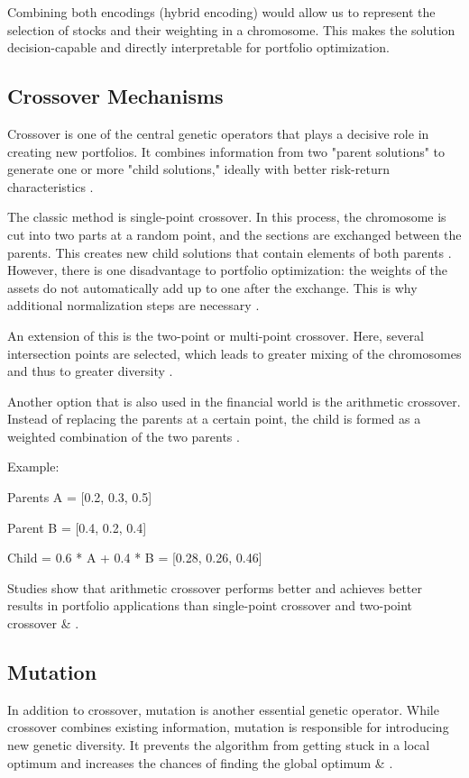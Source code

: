 \documentclass{agasthesis}
\begin{document}
Combining both encodings (hybrid encoding) would allow us to represent the selection of stocks and their weighting in a chromosome. 
This makes the solution decision-capable and directly interpretable for portfolio optimization.

\subsection{Crossover Mechanisms}
Crossover is one of the central genetic operators that plays a decisive role in creating new portfolios. It combines information from two "parent solutions" 
to generate one or more "child solutions," ideally with better risk-return characteristics \cite[p. 8-9]{melanie_introduction_1999}.

The classic method is single-point crossover. In this process, the chromosome is cut into two parts at a random point, and the sections are exchanged between 
the parents. This creates new child solutions that contain elements of both parents \cite[p. 8-9]{melanie_introduction_1999}. However, there is one disadvantage to portfolio 
optimization: the weights of the assets do not automatically add up to one after the exchange. This is why additional normalization steps are necessary \cite[p. 1750]{fu_adopting_2013}.

An extension of this is the two-point or multi-point crossover. Here, several intersection points are selected, which leads to greater mixing of the chromosomes 
and thus to greater diversity \cite[p. 57]{melanie_introduction_1999}. 

Another option that is also used in the financial world is the arithmetic crossover. Instead of replacing the parents at a certain point, 
the child is formed as a weighted combination of the two parents \cite[p. 10]{filograsso_adaptive_2023}.

Example:

Parents A = [0.2, 0.3, 0.5]

Parent B = [0.4, 0.2, 0.4]

Child = 0.6 * A + 0.4 * B = [0.28, 0.26, 0.46]

Studies show that arithmetic crossover performs better and achieves better results in portfolio applications 
than single-point crossover and two-point crossover \cite[p. 71]{dubinskas_investment_2017} & \cite[p. 152]{sefiane_portfolio_2012}.

\subsection{Mutation}
In addition to crossover, mutation is another essential genetic operator. While crossover combines existing information, 
mutation is responsible for introducing new genetic diversity. It prevents the algorithm from getting stuck in a local optimum 
and increases the chances of finding the global optimum \cite[p. 129-130]{melanie_introduction_1999} & \cite[p. 471]{kalayci_review_2017}.
\end{document}
